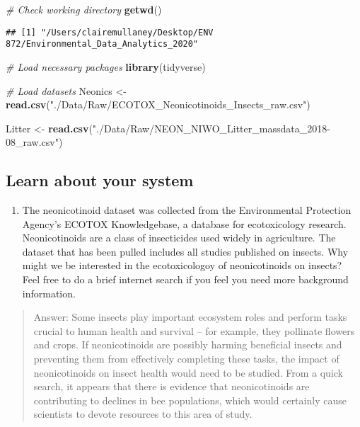 \documentclass[]{article}
\newenvironment{Shaded}{\begin{snugshade}}{\end{snugshade}}
\newcommand{\CommentTok}[1]{\textcolor[rgb]{0.56,0.35,0.01}{\textit{#1}}}
\newcommand{\KeywordTok}[1]{\textcolor[rgb]{0.13,0.29,0.53}{\textbf{#1}}}
\newcommand{\NormalTok}[1]{#1}
\newcommand{\StringTok}[1]{\textcolor[rgb]{0.31,0.60,0.02}{#1}}
\providecommand{\tightlist}{%
  \setlength{\itemsep}{0pt}\setlength{\parskip}{0pt}}
\begin{document}
\begin{Shaded}
\begin{Highlighting}[]
\CommentTok{# Check working directory}
\KeywordTok{getwd}\NormalTok{()}
\end{Highlighting}
\end{Shaded}

\begin{verbatim}
## [1] "/Users/clairemullaney/Desktop/ENV 872/Environmental_Data_Analytics_2020"
\end{verbatim}

\begin{Shaded}
\begin{Highlighting}[]
\CommentTok{# Load necessary packages}
\KeywordTok{library}\NormalTok{(tidyverse)}

\CommentTok{# Load datasets}
\NormalTok{Neonics <-}\StringTok{ }\KeywordTok{read.csv}\NormalTok{(}\StringTok{"./Data/Raw/ECOTOX_Neonicotinoids_Insects_raw.csv"}\NormalTok{)}

\NormalTok{Litter <-}\StringTok{ }\KeywordTok{read.csv}\NormalTok{(}\StringTok{"./Data/Raw/NEON_NIWO_Litter_massdata_2018-08_raw.csv"}\NormalTok{)}
\end{Highlighting}
\end{Shaded}

\hypertarget{learn-about-your-system}{%
\subsection{Learn about your system}\label{learn-about-your-system}}

\begin{enumerate}
\def\labelenumi{\arabic{enumi}.}
\setcounter{enumi}{1}
\tightlist
\item
  The neonicotinoid dataset was collected from the Environmental
  Protection Agency's ECOTOX Knowledgebase, a database for ecotoxicology
  research. Neonicotinoids are a class of insecticides used widely in
  agriculture. The dataset that has been pulled includes all studies
  published on insects. Why might we be interested in the ecotoxicologoy
  of neonicotinoids on insects? Feel free to do a brief internet search
  if you feel you need more background information.
\end{enumerate}

\begin{quote}
Answer: Some insects play important ecosystem roles and perform tasks
crucial to human health and survival -- for example, they pollinate
flowers and crops. If neonicotinoids are possibly harming beneficial
insects and preventing them from effectively completing these tasks, the
impact of neonicotinoids on insect health would need to be studied. From
a quick search, it appears that there is evidence that neonicotinoids
are contributing to declines in bee populations, which would certainly
cause scientists to devote resources to this area of study.
\end{quote}
\end{document}
